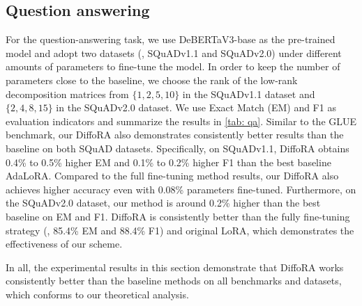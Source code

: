 \subsection{Question answering}
For the question-answering task, we use DeBERTaV3-base as the pre-trained model and adopt two datasets (\ie, SQuADv1.1 and SQuADv2.0) under different amounts of parameters to fine-tune the model.
In order to keep the number of parameters close to the baseline, we choose the rank of the low-rank decomposition matrices from $\{1, 2, 5, 10\}$ in the SQuADv1.1 dataset and $\{2, 4, 8,15\}$ in the SQuADv2.0 dataset.
We use Exact Match (EM) and F1 as evaluation indicators and summarize the results in \cref{tab: qa}.
Similar to the GLUE benchmark, our DiffoRA also demonstrates consistently better results than the baseline on both SQuAD datasets. 
Specifically, on SQuADv1.1, DiffoRA obtains 0.4\% to 0.5\% higher EM and 0.1\% to 0.2\% higher F1 than the best baseline AdaLoRA. 
Compared to the full fine-tuning method results, our DiffoRA also achieves higher accuracy even with 0.08\% parameters fine-tuned. 
Furthermore, on the SQuADv2.0 dataset, our method is around 0.2\% higher than the best baseline on EM and F1. 
DiffoRA is consistently better than the fully fine-tuning strategy (\ie, 85.4\% EM and 88.4\% F1) and original LoRA, which demonstrates the effectiveness of our scheme. 

In all, the experimental results in this section demonstrate that DiffoRA works consistently better than the baseline methods on all benchmarks and datasets, which conforms to our theoretical analysis.




